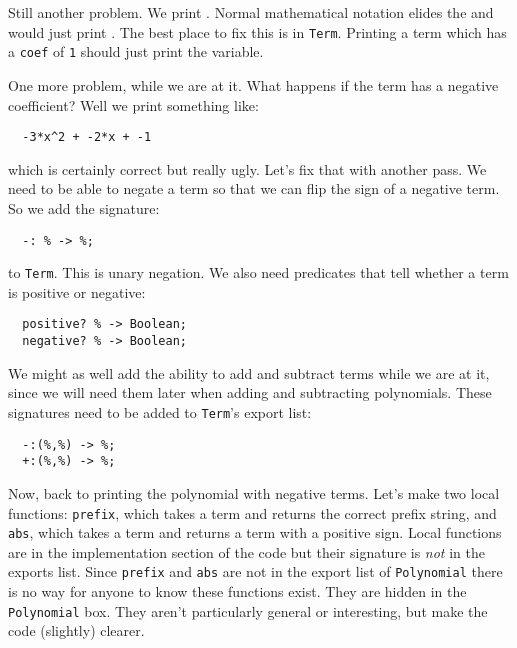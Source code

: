 Still another problem. We print . Normal mathematical notation
elides the    and would just print .
The best place to fix this
is in \verb"Term". Printing a term which has a \verb"coef"
of \verb"1" should just print the variable.

One more problem, while we are at it. What happens if the term has a
negative coefficient? Well we print something like:

\begin{small}
\begin{verbatim}
  -3*x^2 + -2*x + -1
\end{verbatim}
\end{small}

which is certainly correct but really ugly. Let's fix that with another pass.
We need to be able to negate a term so that we can flip the sign of a
negative term. So we add the signature:

\begin{small}
\begin{verbatim}
  -: % -> %;
\end{verbatim}
\end{small}
 
to \verb"Term". This is unary negation. We also need predicates that tell 
whether a term is positive or negative:

\begin{small}
\begin{verbatim}
  positive? % -> Boolean;
  negative? % -> Boolean;
\end{verbatim}
\end{small}

We might as well add the ability to add and subtract terms while 
we are at it, since we will need them later when adding and subtracting 
polynomials. These signatures need to be added to
\verb"Term"'s export list: %

\begin{small}
\begin{verbatim}
  -:(%,%) -> %;
  +:(%,%) -> %;
\end{verbatim}
\end{small}

Now, back to printing the polynomial with negative terms. Let's make two
local functions: \verb"prefix", which takes
a term and returns the correct prefix string,
and \verb"abs", which takes a term and returns
a term with a positive sign.
Local functions are in the implementation section of the code but their
signature is {\em not\/} in the exports list.
Since \verb"prefix" and \verb"abs" are not
in the export list of \verb"Polynomial" there
is no way for anyone to know these functions exist. They are hidden in the
\verb"Polynomial" box. They aren't particularly general or interesting, but 
make the code (slightly) clearer.

